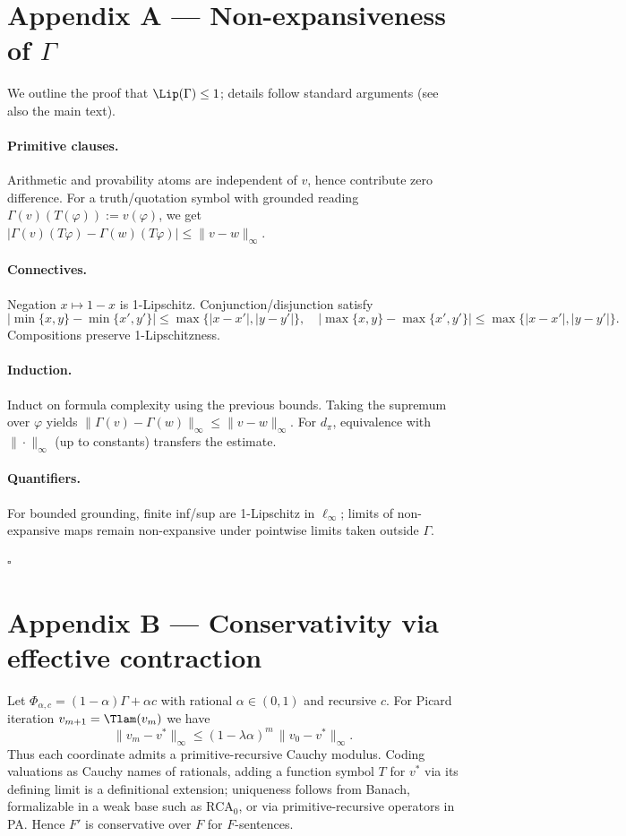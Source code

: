 \documentclass[12]{amsart}
\theoremstyle{plain}
\begin{document}
\section*{Appendix A — Non-expansiveness of $\Gamma$}

We outline the proof that $\Lip(\Gamma)\le 1$; details follow standard arguments (see also the main text).

\paragraph{Primitive clauses.}
Arithmetic and provability atoms are independent of $v$, hence contribute zero difference. For a truth/quotation symbol with grounded reading $\Gamma(v)(T(\varphi)):=v(\varphi)$, we get
$|\Gamma(v)(T\varphi)-\Gamma(w)(T\varphi)|\le \|v-w\|_\infty$.

\paragraph{Connectives.}
Negation $x\mapsto 1-x$ is 1-Lipschitz. Conjunction/disjunction satisfy
\[
|\min\{x,y\}-\min\{x',y'\}|\le \max\{|x-x'|,|y-y'|\},\quad
|\max\{x,y\}-\max\{x',y'\}|\le \max\{|x-x'|,|y-y'|\}.
\]
Compositions preserve 1-Lipschitzness.

\paragraph{Induction.}
Induct on formula complexity using the previous bounds. Taking the supremum over $\varphi$ yields $\|\Gamma(v)-\Gamma(w)\|_\infty \le \|v-w\|_\infty$.
For $d_\pi$, equivalence with $\|\cdot\|_\infty$ (up to constants) transfers the estimate.

\paragraph{Quantifiers.}
For bounded grounding, finite inf/sup are 1-Lipschitz in $\ell_\infty$; limits of non-expansive maps remain non-expansive under pointwise limits taken outside $\Gamma$.

\hfill$\square$

\section*{Appendix B — Conservativity via effective contraction}

Let $\Phi_{\alpha,c}=(1-\alpha)\Gamma+\alpha c$ with rational $\alpha\in(0,1)$ and recursive $c$.
For Picard iteration $v_{m+1}=\Tlam(v_m)$ we have
\[
\|v_m-v^*\|_\infty \le (1-\lambda\alpha)^m \,\|v_0-v^*\|_\infty.
\]
Thus each coordinate admits a primitive-recursive Cauchy modulus. Coding valuations as Cauchy names of rationals, adding a function symbol $T$ for $v^*$ via its defining limit is a definitional extension; uniqueness follows from Banach, formalizable in a weak base such as $\mathrm{RCA}_0$, or via primitive-recursive operators in PA. Hence $F'$ is conservative over $F$ for $F$-sentences.
\end{document}
